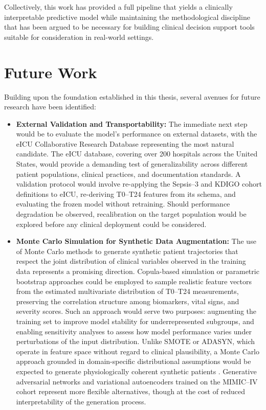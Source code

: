 Collectively, this work has provided a full pipeline that yields a clinically interpretable predictive model while maintaining the methodological discipline that has been argued to be necessary for building clinical decision support tools suitable for consideration in real-world settings.

\section{Future Work}
Building upon the foundation established in this thesis, several avenues for future research have been identified:
\begin{itemize}
    \item \textbf{External Validation and Transportability:} The immediate next step would be to evaluate the model's performance on external datasets, with the eICU Collaborative Research Database representing the most natural candidate. The eICU database, covering over 200 hospitals across the United States, would provide a demanding test of generalizability across different patient populations, clinical practices, and documentation standards. A validation protocol would involve re-applying the Sepsis--3 and KDIGO cohort definitions to eICU, re-deriving T0--T24 features from its schema, and evaluating the frozen model without retraining. Should performance degradation be observed, recalibration on the target population would be explored before any clinical deployment could be considered.

    \item \textbf{Monte Carlo Simulation for Synthetic Data Augmentation:} The use of Monte Carlo methods to generate synthetic patient trajectories that respect the joint distribution of clinical variables observed in the training data represents a promising direction. Copula-based simulation or parametric bootstrap approaches could be employed to sample realistic feature vectors from the estimated multivariate distribution of T0--T24 measurements, preserving the correlation structure among biomarkers, vital signs, and severity scores. Such an approach would serve two purposes: augmenting the training set to improve model stability for underrepresented subgroups, and enabling sensitivity analyses to assess how model performance varies under perturbations of the input distribution. Unlike SMOTE or ADASYN, which operate in feature space without regard to clinical plausibility, a Monte Carlo approach grounded in domain-specific distributional assumptions would be expected to generate physiologically coherent synthetic patients \citep{Blagus_2013}. Generative adversarial networks and variational autoencoders trained on the MIMIC--IV cohort represent more flexible alternatives, though at the cost of reduced interpretability of the generation process.


\end{itemize}
